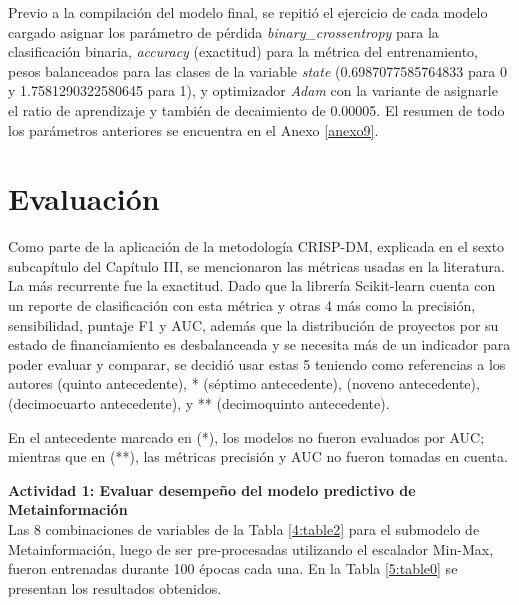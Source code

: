 Previo a la compilación del modelo final, se repitió el ejercicio de cada modelo cargado asignar los parámetro de pérdida \textit{binary\_crossentropy} para la clasificación binaria, \textit{accuracy} (exactitud) para la métrica del entrenamiento, pesos balanceados para las clases de la variable \textit{state} (0.6987077585764833 para 0 y 1.7581290322580645 para 1), y optimizador \textit{Adam} con la variante de asignarle el ratio de aprendizaje y también de decaimiento de 0.00005. El resumen de todo los parámetros anteriores se encuentra en el Anexo \ref{anexo9}.


\section{Evaluación}
Como parte de la aplicación de la metodología CRISP-DM, explicada en el sexto subcapítulo del Capítulo III, se mencionaron las métricas usadas en la literatura. La más recurrente fue la exactitud. Dado que la librería Scikit-learn cuenta con un reporte de clasificación con esta métrica y otras 4 más como la precisión, sensibilidad, puntaje F1 y AUC, además que la distribución de proyectos por su estado de financiamiento es desbalanceada y se necesita más de un indicador para poder evaluar y comparar, se decidió usar estas 5 teniendo como referencias a los autores \citeauthor{pr_beckwith2016predcrowd} (quinto antecedente), \citeauthor{pr_yuan2016textanalytics}* (séptimo antecedente), \citeauthor{pr_kaur2017socmedcrowd} (noveno antecedente), \citeauthor{pr_cheng2019deeplearning} (decimocuarto antecedente), y \citeauthor{pr_chen2019keywords_crowdfunding}** (decimoquinto antecedente).

En el antecedente marcado en (*), los modelos no fueron evaluados por AUC; mientras que en (**), las métricas precisión y AUC no fueron tomadas en cuenta.

\textbf{Actividad 1: Evaluar desempeño del modelo predictivo de Metainformación}
\\
Las 8 combinaciones de variables de la Tabla \ref{4:table2} para el submodelo de Metainformación, luego de ser pre-procesadas utilizando el escalador Min-Max, fueron entrenadas durante 100 épocas cada una. En la Tabla \ref{5:table0} se presentan los resultados obtenidos.

